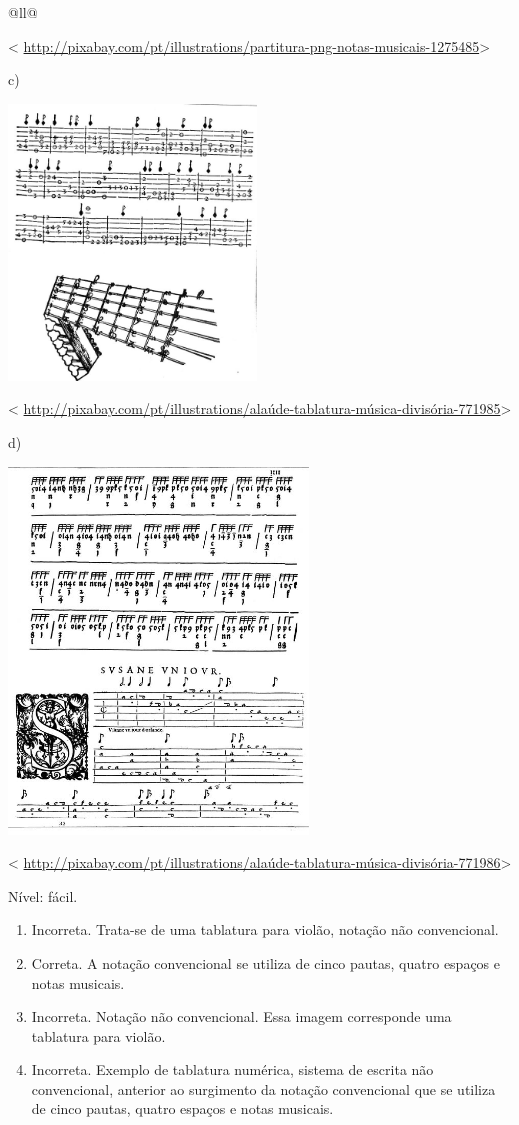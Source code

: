 \begin{itemize}
\begin{itemize}
\begin{escolha}[]{@{}ll@{}}
{{{{{{{{\textless{}
\url{http://pixabay.com/pt/illustrations/partitura-png-notas-musicais-1275485}\textgreater{}

c)

\includegraphics[width=2.59375in,height=2.88542in]{media/image33.jpeg}

\textless{}
\url{http://pixabay.com/pt/illustrations/alaúde-tablatura-música-divisória-771985}\textgreater{}

d)

\includegraphics[width=3.13542in,height=3.83333in]{media/image34.jpeg}

\textless{}
\url{http://pixabay.com/pt/illustrations/alaúde-tablatura-música-divisória-771986}\textgreater{}

Nível: fácil.

\begin{enumerate}
\def\labelenumi{\alph{enumi})}
\item
  Incorreta. Trata-se de uma tablatura para violão, notação não
  convencional.
\item
  Correta. A notação convencional se utiliza de cinco pautas, quatro
  espaços e notas musicais.
\item
  Incorreta. Notação não convencional. Essa imagem corresponde uma
  tablatura para violão.
\item
  Incorreta. Exemplo de tablatura numérica, sistema de escrita não
  convencional, anterior ao surgimento da notação convencional que se
  utiliza de cinco pautas, quatro espaços e notas musicais.
\end{enumerate}

}}}}}}}}
\end{escolha}
\end{itemize}
\end{itemize}
